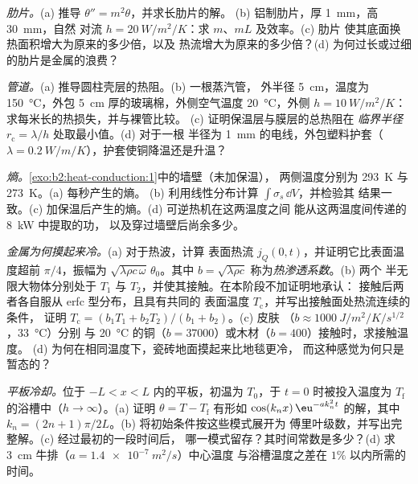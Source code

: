 \begin{exercise}[$\star\star$]\label{exo:b2:heat-conduction:8}
\emph{肋片。}(a) 推导 $\theta'' = m^2\theta$，并求长肋片的解。
(b) 铝制肋片，厚 \qty{1}{mm}，高 \qty{30}{mm}，自然
对流 $h = \qty{20}{W/m^2/K}$：求 $m$、$mL$ 及效率。(c) 肋片
使其底面换热面积增大为原来的多少倍，以及
热流增大为原来的多少倍？(d) 为何过长或过细的肋片是金属的浪费？
\end{exercise}

\begin{exercise}[$\star\star$]\label{exo:b2:heat-conduction:9}
\emph{管道。}(a) 推导圆柱壳层的热阻。(b) 一根蒸汽管，
外半径 \qty{5}{cm}，温度为 \qty{150}{\celsius}，外包
\qty{5}{cm} 厚的玻璃棉，外侧空气温度 \qty{20}{\celsius}，外侧 $h =
\qty{10}{W/m^2/K}$：求每米长的热损失，并与裸管比较。
(c) 证明保温层与膜层的总热阻在
\emph{临界半径} $r_{\text{c}} = \lambda/h$ 处取最小值。(d) 对于一根
半径为 \qty{1}{mm} 的电线，外包塑料护套（$\lambda =
\qty{0.2}{W/m/K}$），护套使铜降温还是升温？
\end{exercise}

\begin{exercise}[$\star\star\star$]\label{exo:b2:heat-conduction:10}
\emph{熵。}\cref{exo:b2:heat-conduction:1}中的墙壁（未加保温），
两侧温度分别为 \qty{293}{K} 与 \qty{273}{K}。(a) 每秒产生的熵。
(b) 利用线性分布计算 $\int\sigma_s\,\dd V$，并检验其
结果一致。(c) 加保温后产生的熵。(d) 可逆热机在这两温度之间
能从这两温度间传递的 \qty{8}{kW} 中提取的功，
以及穿过墙壁后尚余多少。
\end{exercise}

\begin{exercise}[$\star\star\star$]\label{exo:b2:heat-conduction:11}
\emph{金属为何摸起来冷。}(a) 对于热波，计算
表面热流 $j_Q(0,t)$，并证明它比表面温度超前
$\pi/4$，振幅为 $\sqrt{\lambda\rho c\,\omega}\,\theta_0$。其中
$b = \sqrt{\lambda\rho c}$ 称为\emph{热渗透系数}。(b) 两个
半无限大物体分别处于 $T_1$ 与 $T_2$，并使其接触。在本阶段不加证明地承认：
接触后两者各自服从 erfc 型分布，且具有共同的
表面温度 $T_{\text{c}}$，并写出接触面处热流连续的条件，
证明 $T_{\text{c}} = (b_1T_1 + b_2T_2)/(b_1 + b_2)$。(c) 皮肤
（$b \approx \qty{1000}{J/m^2/K/s^{1/2}}$，\qty{33}{\celsius}）分别
与 \qty{20}{\celsius} 的铜（$b = 37000$）或木材（$b = 400$）接触时，求接触温度。
(d) 为何在相同温度下，瓷砖地面摸起来比地毯更冷，
而这种感觉为何只是暂态的？
\end{exercise}

\begin{exercise}[$\star\star\star$]\label{exo:b2:heat-conduction:12}
\emph{平板冷却。}位于 $-L < x < L$ 内的平板，初温为 $T_0$，于 $t =
0$ 时被投入温度为 $T_{\text{f}}$ 的浴槽中（$h \to \infty$）。(a) 证明 $\theta =
T - T_{\text{f}}$ 有形如 $\cos(k_nx)\,\eu^{-ak_n^2t}$ 的解，其中 $k_n
= (2n+1)\pi/2L$。(b) 将初始条件按这些模式展开为
傅里叶级数，并写出完整解。(c) 经过最初的一段时间后，
哪一模式留存？其时间常数是多少？(d) 求
\qty{3}{cm} 牛排（$a = \qty{1.4e-7}{m^2/s}$）中心温度
与浴槽温度之差在 $1\%$ 以内所需的时间。
\end{exercise}

